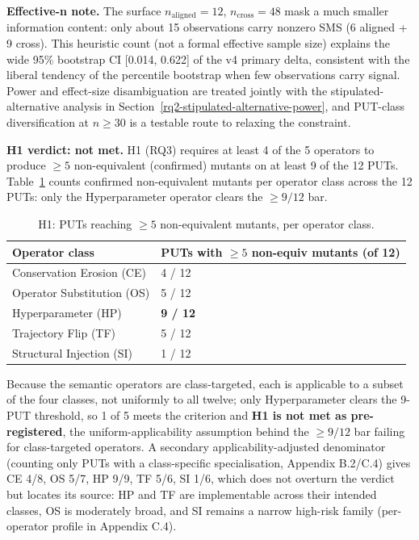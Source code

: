 \documentclass[manuscript,screen,review]{acmart}
\begin{document}
\textbf{Effective-n note.} The surface $n_{\mathrm{aligned}} = 12$,
$n_{\mathrm{cross}} = 48$ mask a much smaller information content: only about 15
observations carry nonzero SMS (6 aligned + 9 cross). This heuristic count (not a
formal effective sample size) explains the wide 95\% bootstrap CI
{[}0.014, 0.622{]} of the v4 primary delta, consistent with the liberal tendency
of the percentile bootstrap when few observations carry signal. Power and
effect-size disambiguation are treated jointly with the stipulated-alternative
analysis in Section~\ref{rq2-stipulated-alternative-power}, and PUT-class
diversification at $n \geq 30$ is a testable route to relaxing the constraint.

\textbf{H1 verdict: not met.} H1 (RQ3) requires at least 4 of the 5
operators to produce $\geq 5$ non-equivalent (confirmed) mutants on at
least 9 of the 12 PUTs. Table~\ref{tab:p2-32} counts confirmed
non-equivalent mutants per operator class across the 12 PUTs: only the
Hyperparameter operator clears the $\geq 9/12$ bar.

{%
\begin{longtable}[]{@{}ll@{}}
\caption{H1: PUTs reaching $\geq 5$ non-equivalent mutants, per operator
class.}\label{tab:p2-32}\\
\toprule\noalign{}
Operator class & PUTs with $\geq 5$ non-equiv mutants (of 12) \\
\midrule\noalign{}
\endfirsthead
\endhead
\bottomrule\noalign{}
\endlastfoot
Conservation Erosion (CE) & 4 / 12 \\
Operator Substitution (OS) & 5 / 12 \\
Hyperparameter (HP) & \textbf{9 / 12} \\
Trajectory Flip (TF) & 5 / 12 \\
Structural Injection (SI) & 1 / 12 \\
\end{longtable}
}

Because the semantic operators are class-targeted, each is applicable to a
subset of the four classes, not uniformly to all twelve; only Hyperparameter
clears the 9-PUT threshold, so 1 of 5 meets the criterion and \textbf{H1 is not
met as pre-registered}, the uniform-applicability assumption behind the
$\geq 9/12$ bar failing for class-targeted operators. A secondary
applicability-adjusted denominator (counting only PUTs with a class-specific
specialisation, Appendix B.2/C.4) gives CE 4/8, OS 5/7, HP 9/9, TF 5/6, SI 1/6,
which does not overturn the verdict but locates its source: HP and TF are
implementable across their intended classes, OS is moderately broad, and SI
remains a narrow high-risk family (per-operator profile in Appendix C.4).
\end{document}
